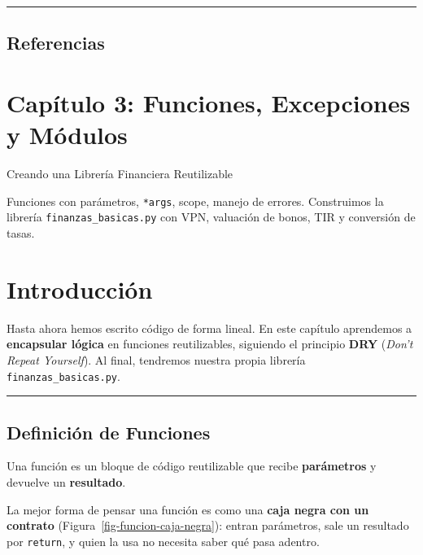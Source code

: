\documentclass[
  spanish,
  letterpaper,
  DIV=11,
  numbers=noendperiod]{scrreprt}
\begin{document}
\begin{center}\rule{0.5\linewidth}{0.5pt}\end{center}

\section{Referencias}\label{referencias-1}

\label{refs}

\chapter{Capítulo 3: Funciones, Excepciones y
Módulos}\label{capuxedtulo-3-funciones-excepciones-y-muxf3dulos}

Creando una Librería Financiera Reutilizable

Funciones con parámetros, \texttt{*args}, scope, manejo de errores.
Construimos la librería \texttt{finanzas\_basicas.py} con VPN, valuación
de bonos, TIR y conversión de tasas.

\hfill\break

\chapter*{Introducción}\label{introducciuxf3n-2}


Hasta ahora hemos escrito código de forma lineal. En este capítulo
aprendemos a \textbf{encapsular lógica} en funciones reutilizables,
siguiendo el principio \textbf{DRY} (\emph{Don't Repeat Yourself}). Al
final, tendremos nuestra propia librería \texttt{finanzas\_basicas.py}.

\begin{center}\rule{0.5\linewidth}{0.5pt}\end{center}

\section{Definición de Funciones}\label{definiciuxf3n-de-funciones}

Una función es un bloque de código reutilizable que recibe
\textbf{parámetros} y devuelve un \textbf{resultado}.

La mejor forma de pensar una función es como una \textbf{caja negra con
un contrato} (Figura~\ref{fig-funcion-caja-negra}): entran parámetros,
sale un resultado por \texttt{return}, y quien la usa no necesita saber
qué pasa adentro.
\end{document}
